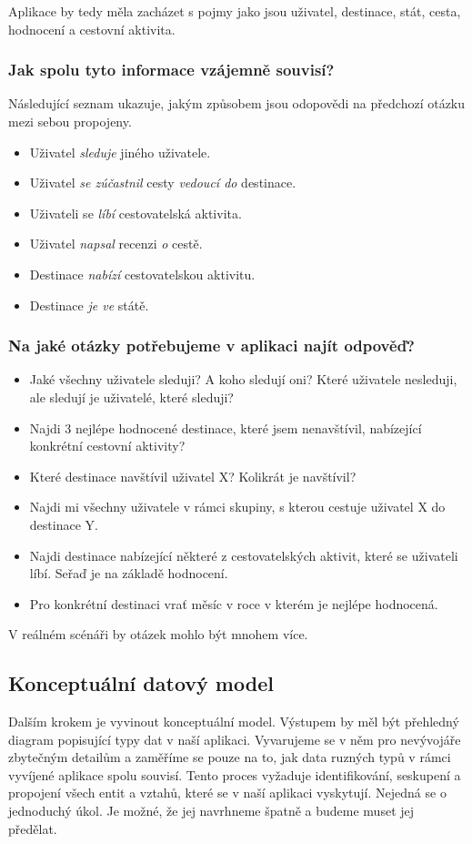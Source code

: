 \documentclass[
  program=infoi,
  biblatex=true,
  sourcecodes=true,
  figures=true,
  glossaries=false,
  index
]{kidiplom}
\begin{document}
Aplikace by tedy měla zacházet s pojmy jako jsou uživatel, destinace, stát, cesta, hodnocení a cestovní aktivita.

\subsubsection{Jak spolu tyto informace vzájemně souvisí?}
Následující seznam ukazuje, jakým způsobem jsou odopovědi na předchozí otázku mezi sebou propojeny. 
\begin{itemize}
  \item Uživatel \textit{sleduje} jiného uživatele.
  \item Uživatel \textit{se zúčastnil} cesty \textit{vedoucí do} destinace.
  \item Uživateli se \textit{líbí} cestovatelská aktivita.
  \item Uživatel \textit{napsal} recenzi \textit{o} cestě.
  \item Destinace \textit{nabízí} cestovatelskou aktivitu.
  \item Destinace \textit{je ve} státě.
\end{itemize}

\subsubsection{Na jaké otázky potřebujeme v aplikaci najít odpověď?}
\label{sec:questions}
\begin{itemize}
  \item Jaké všechny uživatele sleduji? A koho sledují oni? Které uživatele nesleduji, ale sledují je uživatelé, které sleduji?
  \item Najdi 3 nejlépe hodnocené destinace, které jsem nenavštívil, nabízející konkrétní cestovní aktivity?
  \item Které destinace navštívil uživatel X? Kolikrát je navštívil?
  \item Najdi mi všechny uživatele v rámci skupiny, s kterou cestuje uživatel X do destinace Y.
  \item Najdi destinace nabízející některé z cestovatelských aktivit, které se uživateli líbí. Seřaď je na základě hodnocení.
  \item Pro konkrétní destinaci vrať měsíc v roce v kterém je nejlépe hodnocená.
\end{itemize}
V reálném scénáři by otázek mohlo být mnohem více.
 
\subsection{Konceptuální datový model}
Dalším krokem je vyvinout konceptuální model. Výstupem by měl být přehledný diagram popisující typy dat v naší aplikaci. Vyvarujeme se v něm pro nevývojáře zbytečným detailům a zaměříme se pouze na to, jak data ruzných typů v rámci vyvíjené aplikace spolu souvisí. Tento proces vyžaduje identifikování, seskupení a propojení všech entit a vztahů, které se v naší aplikaci vyskytují. Nejedná se o jednoduchý úkol. Je možné, že jej navrhneme špatně a budeme muset jej předělat.
\end{document}
